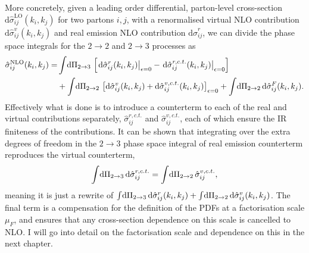 \documentclass[../main.tex]{subfiles}
\begin{document}
More concretely, given a leading order differential, parton-level cross-section \(\mathrm{d}\hat\sigma_{ij}^\text{LO}(k_i, k_j)\) for two partons \(i,j\), with a renormalised virtual NLO contribution \(\mathrm{d}\hat\sigma_{ij}^v(k_i, k_j)\) and real emission NLO contribution \(\mathrm{d}\hat\sigma_{ij}^r\), we can divide the phase space integrals for the \(2 \to 2\) and \(2 \to 3\) processes as
\begin{align}
  \nonumber
  \hat\sigma_{ij}^\text{NLO}(k_i, k_j) = & \int \!\mathrm{d}\Pi_{2\to 3}\, \left[\left.\mathrm{d}\hat\sigma_{ij}^r(k_i,k_j)\right|_{\epsilon=0} - \left.\mathrm{d}\hat\sigma_{ij}^{r, c.t.}(k_i,k_j)\right|_{{\epsilon=0}}\right]                                         \\
                                         & + \int \!\mathrm{d}\Pi_{2\to 2}\, \left[\mathrm{d}\hat\sigma_{ij}^v(k_i,k_j) + \mathrm{d}\hat\sigma_{ij}^{v, c.t.}(k_i,k_j)\right]_{\epsilon = 0} + \int \!\mathrm{d}\Pi_{2\to 2}\, \mathrm{d}\hat\sigma_{ij}^{F}(k_i, k_j).
\end{align}
Effectively what is done is to introduce a counterterm to each of the real and virtual contributions separately, \(\hat\sigma_{ij}^{r,c.t.}\) and \(\hat\sigma_{ij}^{v,c.t.}\), each of which ensure the IR finiteness of the contributions.
It can be shown that integrating over the extra degrees of freedom in the \(2 \to 3\) phase space integral of real emission counterterm reproduces the virtual counterterm,
\begin{align}
  \int \!\mathrm{d}\Pi_{2\to 3}\, \mathrm{d}\hat\sigma_{ij}^{r,c.t.} = \int \!\mathrm{d}\Pi_{2 \to 2}\, \hat\sigma_{ij}^{v,c.t.},
\end{align}
meaning it is just a rewrite of \(\int \!\mathrm{d}\Pi_{2 \to 3}\, \mathrm{d}\hat\sigma_{ij}^r(k_i,k_j) + \int \!\mathrm{d}\Pi_{2 \to 2}\, \mathrm{d}\hat\sigma_{ij}^v(k_i,k_j)\).
The final term is a compensation for the definition of the PDFs at a factorisation scale \(\mu_F\), and ensures that any cross-section dependence on this scale is cancelled to NLO\@.
I will go into detail on the factorisation scale and dependence on this in the next chapter.
\end{document}
